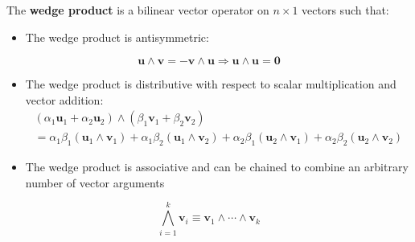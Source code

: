 \documentclass[12pt, twoside, draft]{article}
\begin{document}
The \textbf{wedge product} is  a bilinear vector operator on $n \times 1$ vectors such that:

\begin{itemize}
\item The wedge product is antisymmetric:
\end{itemize}
\begin{equation}\label{eq:wedge_product_antisymmetry}
\mathbf{u} \wedge \mathbf{v} = -\mathbf{v} \wedge \mathbf{u} \Rightarrow \mathbf{u} \wedge \mathbf{u} = \mathbf{0}
\end{equation}
\begin{itemize}
\item The wedge product is distributive with respect to scalar multiplication and vector addition:
\begin{multline}\label{eq:wedge_product_distributive}
\left( \alpha_1 \mathbf{u}_1 + \alpha_2 \mathbf{u}_2 \right) \wedge \left( \beta_1 \mathbf{v}_1 + \beta_2 \mathbf{v}_2 \right) \\
= \alpha_1 \beta_1 \left( \mathbf{u}_1 \wedge \mathbf{v}_1 \right) + \alpha_1 \beta_2 \left( \mathbf{u}_1 \wedge \mathbf{v}_2 \right) + \alpha_2 \beta_1 \left( \mathbf{u}_2 \wedge \mathbf{v}_1 \right) + \alpha_2 \beta_2 \left( \mathbf{u}_2 \wedge \mathbf{v}_2 \right) 
\end{multline}
\item The wedge product is associative and can be chained to combine an arbitrary number of vector arguments
\end{itemize}
\begin{equation}\label{eq:wedge_product_arbitrary}
\bigwedge_{i=1}^k \mathbf{v}_i \equiv \mathbf{v}_1 \wedge \cdots \wedge \mathbf{v}_k
\end{equation}
\end{document}
